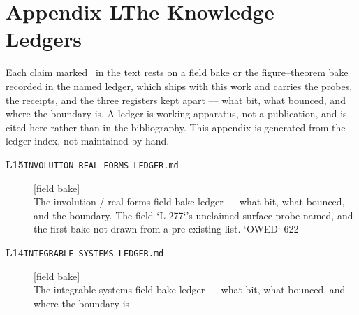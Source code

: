 \clearpage
\section*{Appendix L\quad The Knowledge Ledgers}\label{app:ledgers}
\small\noindent Each claim marked \ldgmarker\ in the text rests on a field bake or the figure--theorem bake recorded in the named ledger, which ships with this work and carries the probes, the receipts, and the three registers kept apart --- what bit, what bounced, and where the boundary is. A ledger is working apparatus, not a publication, and is cited here rather than in the bibliography. This appendix is generated from the ledger index, not maintained by hand.\par\medskip
\begingroup\renewcommand{\arraystretch}{1.25}
\begin{description}
\item[\textbf{L15}\quad\texttt{INVOLUTION\_REAL\_FORMS\_LEDGER.md}]\hfill\textsf{[field bake]}\\
The involution / real-forms field-bake ledger --- what bit, what bounced, and the boundary. The field `L-277`'s unclaimed-surface probe named, and the first bake not drawn from a pre-existing list. `OWED` 622
\item[\textbf{L14}\quad\texttt{INTEGRABLE\_SYSTEMS\_LEDGER.md}]\hfill\textsf{[field bake]}\\
The integrable-systems field-bake ledger --- what bit, what bounced, and where the boundary is
\end{description}
\endgroup
